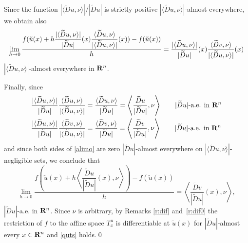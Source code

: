 Since the function $|\langle \widetilde{D}u,\nu\rangle |/|\widetilde{D}u|$
is strictly positive $|\langle \widetilde{D}u,\nu\rangle |$-almost everywhere,
we obtain also
\[
\lim_{h\to 0}\frac{f(\tilde u(x)+h\dfrac{|\langle
\widetilde{D}u,\nu\rangle |}{|\widetilde{D}u|}(x)\dfrac{\langle \widetilde{D}
u,\nu\rangle }{|\langle \widetilde{D}u,\nu\rangle |}(x))-f(\tilde u(x))}{h}\\
=\frac{|\langle \widetilde{D}u,\nu\rangle |}{|\widetilde{D}u|}(x)\frac
{\langle \widetilde{D}v,\nu\rangle }{|\langle
\widetilde{D}u,\nu\rangle |}(x)
\]
$|\langle \widetilde{D}u,\nu\rangle |$-almost everywhere in $\bold R^n$.

Finally, since
\begin{align*}
&\frac{|\langle \widetilde{D}u,\nu\rangle |}{|\widetilde{D}u|}
\frac{\langle \widetilde{D}u,\nu\rangle }{|\langle \widetilde{D}u,\nu\rangle|}
=\frac{\langle \widetilde{D}u,\nu\rangle }{|\widetilde{D}u|}
=\left\langle \frac{\widetilde{D}u}{|\widetilde{D}u|},\nu\right\rangle
        \qquad|\widetilde{D}u|\text{-a.e. in }\bold R^n\\
&\frac{|\langle \widetilde{D}u,\nu\rangle |}{|\widetilde{D}u|}
\frac{\langle \widetilde{D}v,\nu\rangle }{|\langle \widetilde{D}u,\nu\rangle|}
=\frac{\langle \widetilde{D}v,\nu\rangle }{|\widetilde{D}u|}
=\left\langle \frac{\widetilde{D}v}{|\widetilde{D}u|},\nu\right\rangle
        \qquad|\widetilde{D}u|\text{-a.e. in }\bold R^n
\end{align*}
and since both sides of \eqref{alimo}
are zero $|\widetilde{D}u|$-almost everywhere
on $|\langle \widetilde{D}u,\nu\rangle |$-negligible sets, we conclude that
\[
\lim_{h\to 0}\frac{f\left(
\tilde u(x)+h\left\langle \dfrac{\widetilde{D}
u}{|\widetilde{D}u|}(x),\nu\right\rangle \right)-f(\tilde u(x))}h
=\left\langle \frac{\widetilde{D}v}{|\widetilde{D}u|}(x),\nu\right\rangle,
\]
$|\widetilde{D}u|$-a.e. in $\bold R^n$.
Since $\nu$ is arbitrary, by Remarks \ref{r:dif} and~\ref{r:dif0}
the restriction of $f$ to
the affine space $T^u_x$ is differentiable at $\tilde u(x)$ for $|\widetilde{D}
u|$-almost every $x\in \bold R^n$ and \eqref{quts} holds.\qed


